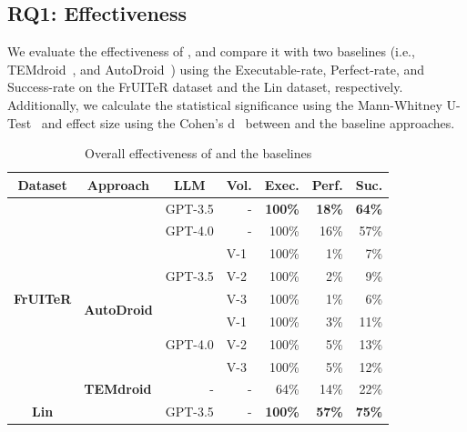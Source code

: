\subsection{RQ1: Effectiveness}
\label{sec:rq1}
We evaluate the effectiveness of \toolNameSmall{}, and compare it with two baselines (i.e., TEMdroid~\cite{zhang2024learning}, and AutoDroid~\cite{wen2023empowering}) using the Executable-rate, Perfect-rate, and Success-rate on the FrUITeR dataset and the Lin dataset, respectively. Additionally, we calculate the statistical significance using the Mann-Whitney U-Test~\cite{mcknight2010mann} and effect size using the Cohen's d~\cite{becker2000effect} between \toolNameSmall{} and the baseline approaches.


\begin{table}[t]
  \centering
  \caption{Overall effectiveness of \toolNameSmall{} and the baselines}
    \begin{tabular}{c|l|l|l|r|r|r}
    \toprule
    \textbf{Dataset} & \multicolumn{1}{c|}{\textbf{Approach}} & \multicolumn{1}{c|}{\textbf{LLM}} & \multicolumn{1}{c|}{\textbf{Vol.}} & \multicolumn{1}{c|}{\textbf{Exec.}} & \multicolumn{1}{c|}{\textbf{Perf.}} & \multicolumn{1}{c}{\textbf{Suc.}} \\
    \midrule
    \multirow{9}[10]{*}{\textbf{FrUITeR}} & \multirow{2}[4]{*}{\textbf{\toolNameSmall{}}} & GPT-3.5 & \multicolumn{1}{r|}{-} & \textbf{100\%} & \textbf{18\%} & \textbf{64\%} \\
\cmidrule{3-7}          &       & GPT-4.0 & \multicolumn{1}{r|}{-} & 100\% & 16\%  & 57\% \\
\cmidrule{2-7}          & \multirow{6}[4]{*}{\textbf{AutoDroid}} & \multirow{3}[2]{*}{GPT-3.5} & V-1   & 100\% & 1\%   & 7\% \\
          &       &       & V-2   & 100\% & 2\%   & 9\% \\
          &       &       & V-3   & 100\% & 1\%   & 6\% \\
\cmidrule{3-7}          &       & \multirow{3}[2]{*}{GPT-4.0} & V-1   & 100\% & 3\%   & 11\% \\
          &       &       & V-2   & 100\% & 5\%   & 13\% \\
          &       &       & V-3   & 100\% & 5\%   & 12\% \\
\cmidrule{2-7}          & \textbf{TEMdroid} & \multicolumn{1}{r|}{-} & \multicolumn{1}{r|}{-} & 64\%  & 14\%  & 22\% \\
    \midrule
    \multirow{11}[14]{*}{\textbf{Lin}} & \multirow{2}[4]{*}{\textbf{\toolNameSmall{}}} & GPT-3.5 & \multicolumn{1}{r|}{-} & \textbf{100\%} & \textbf{57\%} & \textbf{75\%} \\

\end{tabular}
\end{table}
